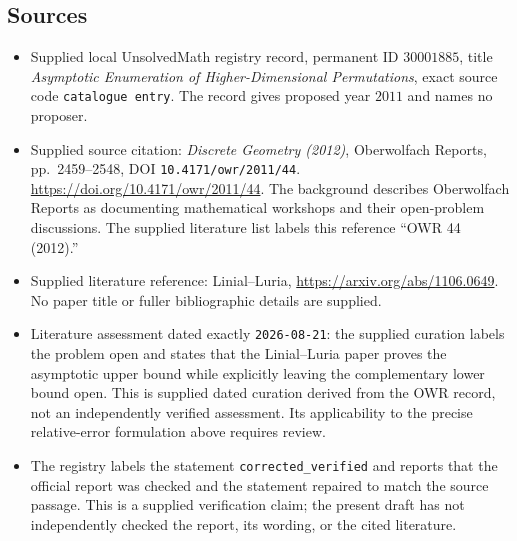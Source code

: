 \documentclass[11pt]{article}
\begin{document}
\subsection{Sources}
\begin{itemize}
\item Supplied local UnsolvedMath registry record, permanent ID \(30001885\), title \emph{Asymptotic Enumeration of Higher-Dimensional Permutations}, exact source code \texttt{catalogue entry}. The record gives proposed year \(2011\) and names no proposer.
\item Supplied source citation: \emph{Discrete Geometry (2012)}, Oberwolfach Reports, pp.\ 2459--2548, DOI \texttt{10.4171/owr/2011/44}. \url{https://doi.org/10.4171/owr/2011/44}. The background describes Oberwolfach Reports as documenting mathematical workshops and their open-problem discussions. The supplied literature list labels this reference ``OWR 44 (2012).''
\item Supplied literature reference: Linial--Luria, \url{https://arxiv.org/abs/1106.0649}. No paper title or fuller bibliographic details are supplied.
\item Literature assessment dated exactly \texttt{2026-08-21}: the supplied curation labels the problem open and states that the Linial--Luria paper proves the asymptotic upper bound while explicitly leaving the complementary lower bound open. This is supplied dated curation derived from the OWR record, not an independently verified assessment. Its applicability to the precise relative-error formulation above requires review.
\item The registry labels the statement \texttt{corrected\_verified} and reports that the official report was checked and the statement repaired to match the source passage. This is a supplied verification claim; the present draft has not independently checked the report, its wording, or the cited literature.
\end{itemize}
\end{document}
